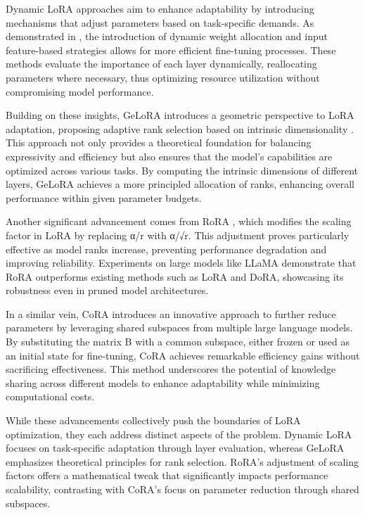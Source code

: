 \documentclass[conference]{IEEEtran}
\begin{document}
Dynamic LoRA approaches aim to enhance adaptability by introducing mechanisms that adjust parameters based on task-specific demands. As demonstrated in \cite{b1}, the introduction of dynamic weight allocation and input feature-based strategies allows for more efficient fine-tuning processes. These methods evaluate the importance of each layer dynamically, reallocating parameters where necessary, thus optimizing resource utilization without compromising model performance.

Building on these insights, GeLoRA introduces a geometric perspective to LoRA adaptation, proposing adaptive rank selection based on intrinsic dimensionality \cite{b2}. This approach not only provides a theoretical foundation for balancing expressivity and efficiency but also ensures that the model's capabilities are optimized across various tasks. By computing the intrinsic dimensions of different layers, GeLoRA achieves a more principled allocation of ranks, enhancing overall performance within given parameter budgets.

Another significant advancement comes from RoRA \cite{b3}, which modifies the scaling factor in LoRA by replacing α/r with α/√r. This adjustment proves particularly effective as model ranks increase, preventing performance degradation and improving reliability. Experiments on large models like LLaMA demonstrate that RoRA outperforms existing methods such as LoRA and DoRA, showcasing its robustness even in pruned model architectures.

In a similar vein, CoRA \cite{b4} introduces an innovative approach to further reduce parameters by leveraging shared subspaces from multiple large language models. By substituting the matrix B with a common subspace, either frozen or used as an initial state for fine-tuning, CoRA achieves remarkable efficiency gains without sacrificing effectiveness. This method underscores the potential of knowledge sharing across different models to enhance adaptability while minimizing computational costs.

While these advancements collectively push the boundaries of LoRA optimization, they each address distinct aspects of the problem. Dynamic LoRA focuses on task-specific adaptation through layer evaluation, whereas GeLoRA emphasizes theoretical principles for rank selection. RoRA's adjustment of scaling factors offers a mathematical tweak that significantly impacts performance scalability, contrasting with CoRA's focus on parameter reduction through shared subspaces.
\end{document}
